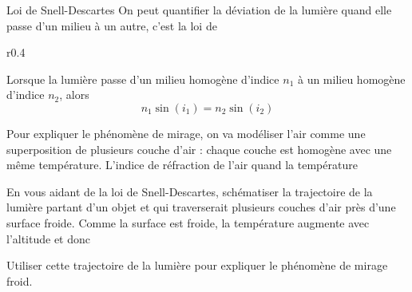 \begin{doc}{Loi de Snell-Descartes}
  On peut quantifier la déviation de la lumière quand elle passe d'un milieu à un autre, c'est la loi de 

  \vspace*{-16pt}
  \begin{wrapfigure}{r}{0.4\linewidth}
    \centering
  \end{wrapfigure}
  \phantom{b}
  \begin{importants}
    Lorsque la lumière passe d'un milieu homogène d'indice $n_1$ à un milieu homogène d'indice $n_2$, alors
    \begin{equation*}
      n_1 \sin(i_1) = n_2 \sin(i_2)
    \end{equation*}
  \end{importants}
  \phantom{b}
\end{doc}

\schematisation
Pour expliquer le phénomène de mirage, on va modéliser l'air comme une superposition de plusieurs couche d'air : chaque couche est homogène avec une même température.
L'indice de réfraction de l'air  quand la température 

En vous aidant de la loi de Snell-Descartes, schématiser la trajectoire de la lumière partant d'un objet et qui traverserait plusieurs couches d'air près d'une surface froide.
Comme la surface est froide, la température augmente avec l'altitude et donc 

\documentaire
Utiliser cette trajectoire de la lumière pour expliquer le phénomène de mirage froid.